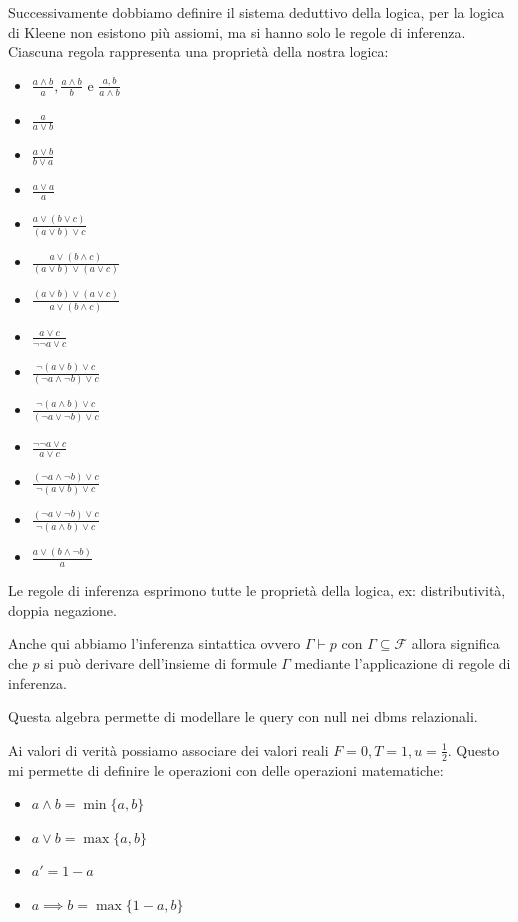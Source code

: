 Successivamente dobbiamo definire il sistema deduttivo della logica, per la logica 
di Kleene non esistono più assiomi, ma si hanno solo le regole di inferenza.
Ciascuna regola rappresenta una proprietà della nostra logica:
\begin{itemize}
    \item $\frac{a\land b}{a}, \frac{a\land b}{b}$ e $\frac{a, b}{a\land b}$
    \item $\frac{a}{a\lor b}$
    \item $\frac{a\lor b}{b\lor a}$
    \item $\frac{a\lor a}{ a}$
    \item $\frac{a\lor (b\lor c)}{ (a\lor b)\lor c}$
    \item $\frac{a\lor (b\land c)}{ (a\lor b) \lor (a\lor c)}$
    \item $\frac{ (a\lor b) \lor (a\lor c)}{a\lor (b\land c)}$
    \item $\frac{ a\lor c}{\lnot \lnot a\lor c}$
    \item $\frac{ \lnot(a\lor b)\lor c}{(\lnot a\land \lnot b)\lor c}$
    \item $\frac{ \lnot(a\land b)\lor c}{(\lnot a\lor \lnot b)\lor c}$
    \item $\frac{\lnot \lnot a\lor c}{ a\lor c}$
    \item $\frac{(\lnot a\land \lnot b)\lor c}{ \lnot(a\lor b)\lor c}$
    \item $\frac{(\lnot a\lor \lnot b)\lor c}{ \lnot(a\land b)\lor c}$
    \item $\frac{a\lor (b\land \lnot b)}{ a}$
\end{itemize}
Le regole di inferenza esprimono tutte le proprietà della logica,  ex: distributività, doppia negazione.

Anche qui abbiamo l'inferenza sintattica ovvero $\Gamma \vdash p$ con $\Gamma \subseteq \mathcal{F}$
allora significa che $p$ si può derivare dell'insieme di formule $\Gamma$ mediante 
l'applicazione di regole di inferenza.

Questa algebra permette di modellare le query con null nei dbms relazionali.

Ai valori di verità possiamo associare dei valori reali $F=0, T=1,u=\frac{1}{2}$.
Questo mi permette di definire le operazioni con delle operazioni matematiche:
\begin{itemize}
    \item $a\land b = \min \{a,b\}$
    \item $a\lor b = \max \{a,b\}$
    \item $a' = 1-a$
    \item $a\implies b = \max \{1-a,b\}$
\end{itemize}

